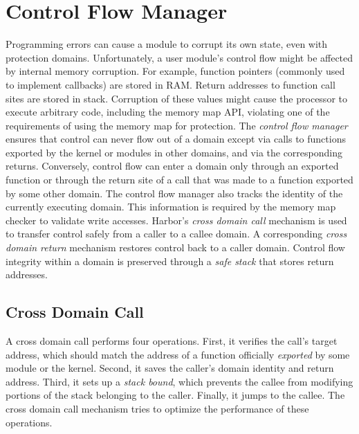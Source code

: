 \section{Control Flow Manager}
\label{sec:cfmgr}
%
Programming errors can cause a module to corrupt its own state, even with
protection domains.
%
%
Unfortunately, a user module's control flow might be affected by internal memory
corruption.
%
For example, function pointers (commonly used to implement callbacks)
are stored in RAM.
%
Return addresses to function call sites are stored in stack.
%
Corruption of these values might cause the processor to execute
arbitrary code, including the memory map API,
%
violating one of the requirements of using the memory map for
protection.
%
The \emph{control flow manager} ensures that control can never flow out of
a domain except via calls to functions exported by the kernel or modules in
other domains, and via the corresponding returns.
%
Conversely, control flow can enter a domain only through an exported
function or through the return site of a call that was made to a
function exported by some other domain.
%
The control flow manager also tracks the identity of the currently
executing domain.
%
This information is required by the memory map checker to validate write
accesses.
%
Harbor's \emph{cross domain call} mechanism is used
to transfer control safely from a caller to a callee domain.
%
A corresponding \emph{cross domain return} mechanism restores control back to
a caller domain. 
%
Control flow integrity within a domain is preserved through a \emph{safe stack}
that stores return addresses.
%
\subsection{Cross Domain Call}
\label{sec:crossdomcall}
%
%
%
%
A cross domain call performs four operations.
%
First, it verifies the call's target address, which
%
should match the address of a function officially \emph{exported} by some
module or the kernel.
%
Second, it saves the caller's domain identity and return address.
%
Third, it sets up a \emph{stack bound}, which prevents the callee from
modifying portions of the stack belonging to the caller.
%
Finally, it jumps to the callee.
%
%
The cross domain call mechanism tries to optimize the performance of these operations.
%

